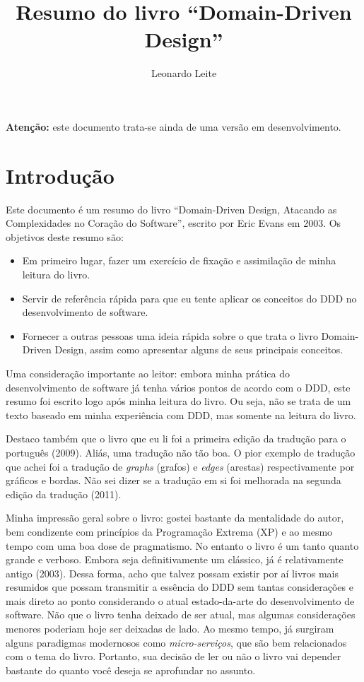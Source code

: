 \documentclass[a4paper, 12pt]{article}
\title{Resumo do livro ``Domain-Driven Design''}
\author{Leonardo Leite}
\begin{document}
\maketitle

\textbf{Atenção: } este documento trata-se ainda de uma versão em desenvolvimento.

\section{Introdução}

Este documento é um resumo do livro ``Domain-Driven Design, Atacando as Complexidades no Coração do Software'', escrito por Eric Evans em 2003. Os objetivos deste resumo são:

\begin{itemize}
\item Em primeiro lugar, fazer um exercício de fixação e assimilação de minha leitura do livro.
\item Servir de referência rápida para que eu tente aplicar os conceitos do DDD no desenvolvimento de software.
\item Fornecer a outras pessoas uma ideia rápida sobre o que trata o livro Domain-Driven Design, assim como apresentar alguns de seus principais conceitos.
\end{itemize}

Uma consideração importante ao leitor: embora minha prática do desenvolvimento de software já tenha vários pontos de acordo com o DDD, este resumo foi escrito logo após minha leitura do livro. Ou seja, não se trata de um texto baseado em minha experiência com DDD, mas somente na leitura do livro.

Destaco também que o livro que eu li foi a primeira edição da tradução para o português (2009). Aliás, uma tradução não tão boa. O pior exemplo de tradução que achei foi a tradução de \emph{graphs} (grafos) e \emph{edges} (arestas) respectivamente por gráficos e bordas. Não sei dizer se a tradução em si foi melhorada na segunda edição da tradução (2011).

Minha impressão geral sobre o livro: gostei bastante da mentalidade do autor, bem condizente com princípios da Programação Extrema (XP) e ao mesmo tempo com uma boa dose de pragmatismo. No entanto o livro é um tanto quanto grande e verboso. Embora seja definitivamente um clássico, já é relativamente antigo (2003). Dessa forma, acho que talvez possam existir por aí livros mais resumidos que possam transmitir a essência do DDD sem tantas considerações e mais direto ao ponto considerando o atual estado-da-arte do desenvolvimento de software. Não que o livro tenha deixado de ser atual, mas algumas considerações menores poderiam hoje ser deixadas de lado. Ao mesmo tempo, já surgiram alguns paradigmas modernosos como \emph{micro-serviços}, que são bem relacionados com o tema do livro. Portanto, sua decisão de ler ou não o livro vai depender bastante do quanto você deseja se aprofundar no assunto.
\end{document}

